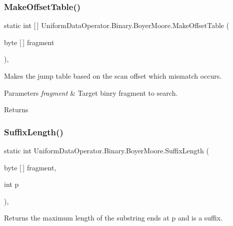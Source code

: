 \subsubsection{\texorpdfstring{Make\+Offset\+Table()}{MakeOffsetTable()}}
{\footnotesize\ttfamily static int \mbox{[}$\,$\mbox{]} Uniform\+Data\+Operator.\+Binary.\+Boyer\+Moore.\+Make\+Offset\+Table (\begin{DoxyParamCaption}\item[{byte \mbox{[}$\,$\mbox{]}}]{fragment }\end{DoxyParamCaption})\hspace{0.3cm}{\ttfamily [static]}, {\ttfamily [private]}}



Makes the jump table based on the scan offset which mismatch occurs. 


\begin{DoxyParams}{Parameters}
{\em fragment} & Target binry fragment to search.\\
\hline
\end{DoxyParams}
\begin{DoxyReturn}{Returns}

\end{DoxyReturn}
\mbox{\label{class_uniform_data_operator_1_1_binary_1_1_boyer_moore_afc33837427631cdffa540614247e4ffc}} 
\subsubsection{\texorpdfstring{Suffix\+Length()}{SuffixLength()}}
{\footnotesize\ttfamily static int Uniform\+Data\+Operator.\+Binary.\+Boyer\+Moore.\+Suffix\+Length (\begin{DoxyParamCaption}\item[{byte \mbox{[}$\,$\mbox{]}}]{fragment,  }\item[{int}]{p }\end{DoxyParamCaption})\hspace{0.3cm}{\ttfamily [static]}, {\ttfamily [private]}}



Returns the maximum length of the substring ends at p and is a suffix. 


